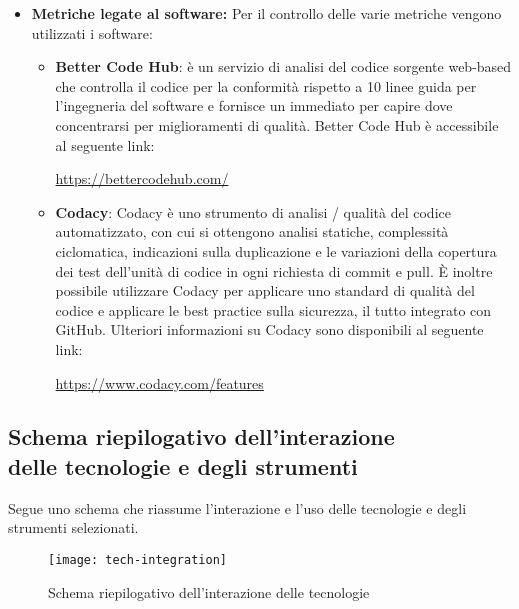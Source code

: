 \documentclass[../NormediProgetto.tex]{subfiles}
\begin{document}
\begin{itemize}
		\item \textbf{Metriche legate al software:} Per il controllo delle varie metriche vengono utilizzati i software:
		\begin{itemize}
			\item \textbf{Better Code Hub}:  è un servizio di analisi del codice sorgente web-based che controlla il codice per la conformità rispetto a 10 linee guida per l'ingegneria del software e fornisce un  immediato per capire dove concentrarsi per miglioramenti di qualità. Better Code Hub è accessibile al seguente link:
			\begin{center}
				\url{https://bettercodehub.com/}
			\end{center}
		
			\item \textbf{Codacy}: Codacy è uno strumento di analisi / qualità del codice automatizzato, con cui si ottengono analisi statiche, complessità ciclomatica, indicazioni sulla duplicazione e le variazioni della copertura dei test dell'unità di codice in ogni richiesta di commit e pull. È inoltre possibile utilizzare Codacy per applicare uno standard di qualità del codice e applicare le best practice sulla sicurezza, il tutto integrato con GitHub. Ulteriori informazioni su Codacy sono disponibili al seguente link:
			\begin{center}
				\url{https://www.codacy.com/features}
			\end{center}
		\end{itemize} 
	\end{itemize}

	
	\subsection{Schema riepilogativo dell'interazione \\ delle tecnologie e degli strumenti}
	
	Segue uno schema che riassume l'interazione e l'uso delle tecnologie e degli strumenti selezionati.
	
	\begin{figure}
		\texttt{[image: tech-integration]}
		\centering
		\caption{Schema riepilogativo dell'interazione delle tecnologie}
	\end{figure}
\end{document}
